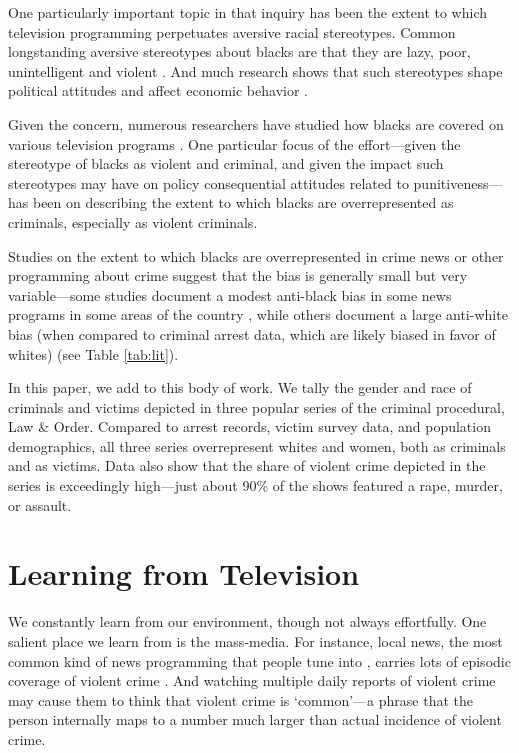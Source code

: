 \documentclass[12pt, letterpaper]{article}
\begin{document}
One particularly important topic in that inquiry has been the extent to which television programming perpetuates aversive racial stereotypes. Common longstanding aversive stereotypes about blacks are that they are lazy, poor, unintelligent and violent \citep{katz1933racial, peffley1997racial, sood2010hidden}. And much research shows that such stereotypes shape political attitudes \citep[see, for e.g.,][]{sniderman1995scar, hurwitz1997public, peffley1997racial, dixon2006psychological} and affect economic behavior \citep[see, for e.g.,][]{bertrand2004emily}. 

Given the concern, numerous researchers have studied how blacks are covered on various television programs \citep[for e.g.,][]{entman2001black, eschholz2004images}. One particular focus of the effort---given the stereotype of blacks as violent and criminal, and given the impact such stereotypes may have on policy consequential attitudes related to punitiveness---has been on describing the extent to which blacks are overrepresented as criminals, especially as violent criminals. 

Studies on the extent to which blacks are overrepresented in crime news or other programming about crime suggest that the bias is generally small but very variable---some studies document a modest anti-black bias in some news programs in some areas of the country \citep{gilliam1996crime}, while others document a large anti-white bias (when compared to criminal arrest data, which are likely biased in favor of whites) \citep{chiricos2002racial, dixon2000overrepresentation, eschholz2004images} (see Table \ref{tab:lit}). 



In this paper, we add to this body of work. We tally the gender and race of criminals and victims depicted in three popular series of the criminal procedural, Law \& Order. Compared to arrest records, victim survey data, and population demographics, all three series overrepresent whites and women, both as criminals and as victims. Data also show that the share of violent crime depicted in the series is exceedingly high---just about 90\% of the shows featured a rape, murder, or assault.

\section*{Learning from Television}

We constantly learn from our environment, though not always effortfully. One salient place we learn from is the mass-media. For instance, local news, the most common kind of news programming that people tune into \citep{pew2004}, carries lots of episodic coverage of violent crime \citep[see, for instance,][]{gross2006covering, klite1997local}. And watching multiple daily reports of violent crime may cause them to think that violent crime is `common'---a phrase that the person internally maps to a number much larger than actual incidence of violent crime.
\end{document}
